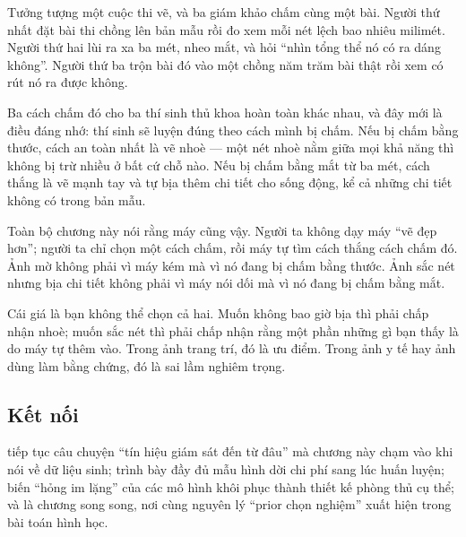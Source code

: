 \documentclass[../../deep_learning.tex]{subfiles}
\begin{document}
\begin{dongian}
Tưởng tượng một cuộc thi vẽ, và ba giám khảo chấm cùng một bài. Người thứ nhất đặt bài thi chồng lên bản mẫu rồi đo xem mỗi nét lệch bao nhiêu milimét. Người thứ hai lùi ra xa ba mét, nheo mắt, và hỏi ``nhìn tổng thể nó có ra dáng không''. Người thứ ba trộn bài đó vào một chồng năm trăm bài thật rồi xem có rút nó ra được không.

Ba cách chấm đó cho ba thí sinh thủ khoa hoàn toàn khác nhau, và đây mới là điều đáng nhớ: thí sinh sẽ luyện đúng theo cách mình bị chấm. Nếu bị chấm bằng thước, cách an toàn nhất là vẽ nhoè --- một nét nhoè nằm giữa mọi khả năng thì không bị trừ nhiều ở bất cứ chỗ nào. Nếu bị chấm bằng mắt từ ba mét, cách thắng là vẽ mạnh tay và tự bịa thêm chi tiết cho sống động, kể cả những chi tiết không có trong bản mẫu.

Toàn bộ chương này nói rằng máy cũng vậy. Người ta không dạy máy ``vẽ đẹp hơn''; người ta chỉ chọn một cách chấm, rồi máy tự tìm cách thắng cách chấm đó. Ảnh mờ không phải vì máy kém mà vì nó đang bị chấm bằng thước. Ảnh sắc nét nhưng bịa chi tiết không phải vì máy nói dối mà vì nó đang bị chấm bằng mắt.

Cái giá là bạn không thể chọn cả hai. Muốn không bao giờ bịa thì phải chấp nhận nhoè; muốn sắc nét thì phải chấp nhận rằng một phần những gì bạn thấy là do máy tự thêm vào. Trong ảnh trang trí, đó là ưu điểm. Trong ảnh y tế hay ảnh dùng làm bằng chứng, đó là sai lầm nghiêm trọng.

\end{dongian}

\subsection*{Kết nối}
 tiếp tục câu chuyện ``tín hiệu giám sát đến từ đâu'' mà chương này chạm vào khi nói về dữ liệu sinh;  trình bày đầy đủ mẫu hình dời chi phí sang lúc huấn luyện;  biến ``hỏng im lặng'' của các mô hình khôi phục thành thiết kế phòng thủ cụ thể; và  là chương song song, nơi cùng nguyên lý ``prior chọn nghiệm'' xuất hiện trong bài toán hình học.
\end{document}
